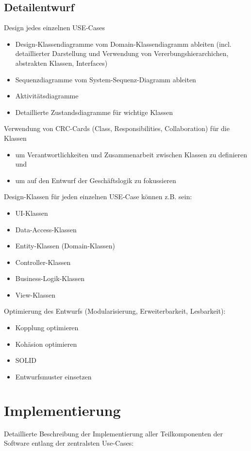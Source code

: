 \section{Detailentwurf}

Design jedes einzelnen USE-Cases

\begin{itemize}
	\item Design-Klassendiagramme vom Domain-Klassendiagramm ableiten (incl. detaillierter Darstellung und Verwendung von Vererbungshierarchichen, abstrakten Klassen, Interfaces)
	\item Sequenzdiagramme vom System-Sequenz-Diagramm ableiten
	\item Aktivitätsdiagramme
	\item Detaillierte Zustandsdiagramme für wichtige Klassen
\end{itemize}

Verwendung von CRC-Cards (Class, Responsibilities, Collaboration) für die Klassen
\begin{itemize}
	\item um Verantwortlichkeiten und Zusammenarbeit zwischen Klassen zu definieren und
	\item um auf den Entwurf der Geschäftslogik zu fokussieren
\end{itemize}

Design-Klassen für jeden einzelnen USE-Case können z.B. sein:

\begin{itemize}
	\item UI-Klassen
	\item Data-Access-Klassen
	\item Entity-Klassen (Domain-Klassen)
	\item Controller-Klassen
	\item Business-Logik-Klassen
	\item View-Klassen
\end{itemize}

Optimierung des Entwurfs (Modularisierung, Erweiterbarkeit, Lesbarkeit):

\begin{itemize}
	\item Kopplung optimieren
	\item Kohäsion optimieren
	\item SOLID
	\item Entwurfsmuster einsetzen
\end{itemize}

\chapter{Implementierung}
Detaillierte Beschreibung der Implementierung aller Teilkomponenten der Software entlang der zentralsten Use-Cases:

